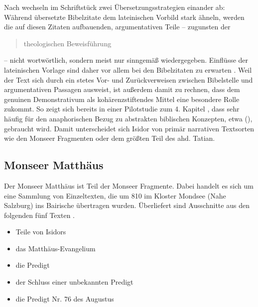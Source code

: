 
Nach \textcite{Matzel1970} wechseln im Schriftstück zwei Übersetzungsstrategien einander ab: Während übersetzte Bibelzitate dem lateinischen Vorbild stark ähneln, werden die auf diesen Zitaten aufbauenden, argumentativen Teile -- zugunsten der \blockcquote[357]{Matzel1970}{theologischen Beweisführung} -- nicht wortwörtlich, sondern meist nur sinngemäß wiedergegeben. Einflüsse der lateinischen Vorlage sind daher vor allem bei den Bibelzitaten zu erwarten \parencites()()[33]{Fleischer2006}[45-46]{Schlachter2012}. Weil der Text sich durch ein stetes Vor- und Zurückverweisen zwischen Bibelstelle und argumentativen Passagen ausweist, ist außerdem damit zu rechnen, dass dem genuinen Demonstrativum  als kohärenzstiftendes Mittel eine besondere Rolle zukommt. So zeigt sich bereits in einer Pilotstudie zum 4. Kapitel \parencite[s.][]{Szczepaniak2015}, dass  sehr häufig für den anaphorischen Bezug zu abstrakten biblischen Konzepten, etwa  (), gebraucht wird. Damit unterscheidet sich Isidor von primär narrativen Textsorten wie den Monseer Fragmenten oder dem größten Teil des ahd. Tatian.   


\subsection{Monseer Matthäus} \label{sec:monsee}

Der Monseer Matthäus ist Teil der Monseer Fragmente. Dabei handelt es sich um eine Sammlung von Einzeltexten, die um 810 im Kloster Mondsee (Nahe Salzburg) ins Bairische übertragen wurden. Überliefert sind Ausschnitte aus den folgenden fünf Texten \parencite{Krotz2003}.


\begin{itemize}
\item Teile von Isidors  
\item das Matthäus-Evangelium
\item die Predigt 
\item der Schluss einer unbekannten Predigt
\item die Predigt Nr. 76 des Augustus
\end{itemize}

